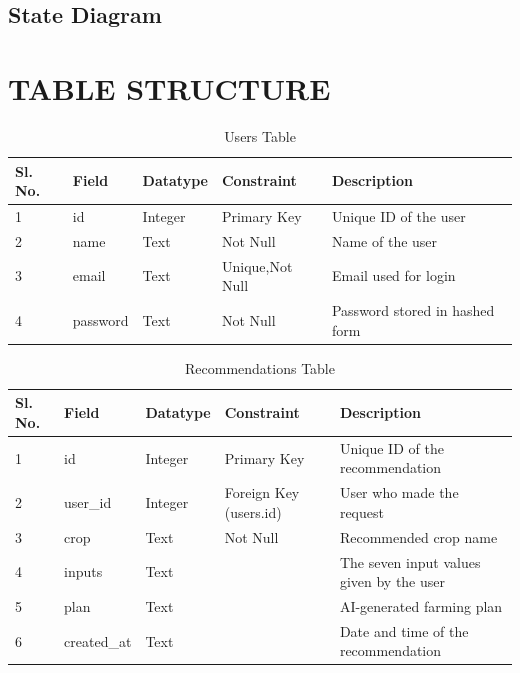 \section{State Diagram}
%
%
%
\chapter{TABLE STRUCTURE}
\begin{table}
 \centering
  \begin{tabular}{|l|l|l|l|l|}
    \hline 
  \textbf{ Sl. No.}&  \textbf{Field}& \textbf{ Datatype}& \textbf{ Constraint}&\textbf{ Description} \\
     \hline  
    1 & id &Integer &Primary Key  & Unique ID of the user\\ 
      \hline 
     2 & name  & Text & Not Null &  Name of the user\\
     \hline 
     3  & email & Text & Unique,Not Null & Email used for login \\ 
				\hline
     4&password&Text&Not Null&Password stored in hashed form\\
     \hline
    \end{tabular}
    \caption{Users Table}
\label{table:users}
\end{table}
\begin{table}
 \centering
  \begin{tabular}{|l|l|l|l|l|}
    \hline 
   \textbf{Sl. No.}& \textbf{ Field}& \textbf{ Datatype}& \textbf{ Constraint}&\textbf{ Description} \\
     \hline  
    1 & id& Integer &Primary Key  &Unique ID of the recommendation \\ 
      \hline 
     2 & user\_id & Integer& Foreign Key (users.id)&User who made the request\\
     \hline 
     3  & crop & Text & Not Null & Recommended crop name \\ 
				\hline
	4&inputs&Text&&The seven input values given by the user\\
	\hline
	5&plan&Text&&AI-generated farming plan\\
	\hline
	6&created\_at&Text&&Date and time of the recommendation\\
	\hline
    \end{tabular}
    \caption{Recommendations Table}
\label{table:recommendations}
\end{table}

%
